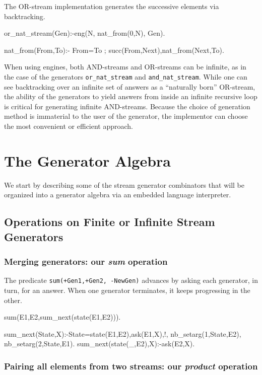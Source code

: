 \documentclass{new_tlp}
\begin{document}
The OR-stream implementation generates the successive elements via backtracking.
\begin{code}
or_nat_stream(Gen):-eng(N, nat_from(0,N), Gen).

nat_from(From,To):- From=To ; succ(From,Next),nat_from(Next,To).
\end{code}

When using engines, 
both AND-streams and OR-streams can be infinite, as in the
case of the generators {\tt or\_nat\_stream} and {\tt and\_nat\_stream}.
While one can see backtracking over an infinite set of answers as
a ``naturally born'' OR-stream, the ability of the generators to
yield answers from inside an infinite recursive loop is critical
for generating infinite AND-streams.
Because the choice of generation method is immaterial to the user of the generator,
the implementor can choose the most convenient or efficient approach.

\section{The Generator Algebra}\label{alg}
We start by describing some of the stream generator combinators
that will be organized into a generator algebra 
via an embedded language interpreter.
 
\subsection{Operations on Finite or  Infinite Stream Generators}

\subsubsection{Merging generators: our {\em sum} operation}

The predicate {\tt sum(+Gen1,+Gen2, -NewGen)} advances by asking each generator, in turn, for an answer. When one generator terminates, it keeps progressing in the other.
\begin{code}
sum(E1,E2,sum_next(state(E1,E2))).

sum_next(State,X):-State=state(E1,E2),ask(E1,X),!,
  nb_setarg(1,State,E2),
  nb_setarg(2,State,E1).
sum_next(state(_,E2),X):-ask(E2,X).
\end{code}

\subsubsection{Pairing all elements from two streams: our {\em product} operation}
\end{document}

